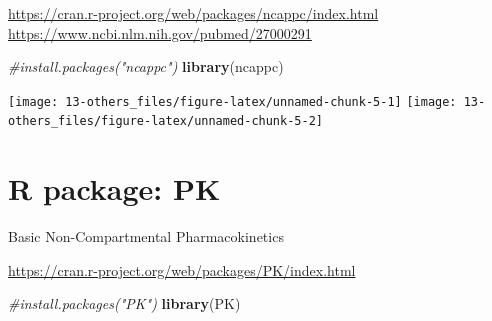 \documentclass[12pt,]{krantz}
\newenvironment{Shaded}{\begin{snugshade}}{\end{snugshade}}
\newcommand{\CommentTok}[1]{\textcolor[rgb]{0.56,0.35,0.01}{\textit{#1}}}
\newcommand{\DataTypeTok}[1]{\textcolor[rgb]{0.13,0.29,0.53}{#1}}
\newcommand{\KeywordTok}[1]{\textcolor[rgb]{0.13,0.29,0.53}{\textbf{#1}}}
\newcommand{\NormalTok}[1]{#1}
\newcommand{\OperatorTok}[1]{\textcolor[rgb]{0.81,0.36,0.00}{\textbf{#1}}}
\newcommand{\OtherTok}[1]{\textcolor[rgb]{0.56,0.35,0.01}{#1}}
\newcommand{\StringTok}[1]{\textcolor[rgb]{0.31,0.60,0.02}{#1}}
\begin{document}
\url{https://cran.r-project.org/web/packages/ncappc/index.html}
\url{https://www.ncbi.nlm.nih.gov/pubmed/27000291}

\begin{Shaded}
\begin{Highlighting}[]
\CommentTok{#install.packages("ncappc")}
\KeywordTok{library}\NormalTok{(ncappc)}
\end{Highlighting}
\end{Shaded}

\begin{Shaded}
\end{Shaded}

\texttt{[image: 13-others\_files/figure-latex/unnamed-chunk-5-1]}
\texttt{[image: 13-others\_files/figure-latex/unnamed-chunk-5-2]}

\hypertarget{r-package-pk}{%
\section{R package: PK}\label{r-package-pk}}

Basic Non-Compartmental Pharmacokinetics

\url{https://cran.r-project.org/web/packages/PK/index.html}

\begin{Shaded}
\begin{Highlighting}[]
\CommentTok{#install.packages("PK")}
\KeywordTok{library}\NormalTok{(PK)}
\end{Highlighting}
\end{Shaded}
\end{document}
